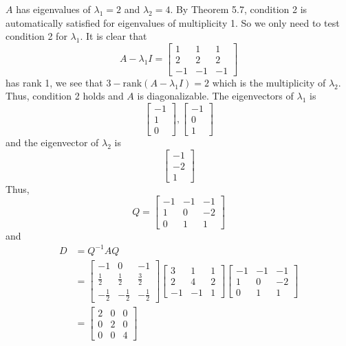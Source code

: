 \documentclass[11pt]{scrartcl}
\begin{document}
\begin{enumerate}[label=\alph*.]
{	      $A$ has eigenvalues of $\lambda_1 = 2 $ and $\lambda_2 = 4$.
	      By Theorem 5.7, condition 2 is automatically satisfied for eigenvalues of multiplicity 1.
	      So we only need to test condition 2 for $\lambda_1$.
	      It is clear that
	      \[
		      A - \lambda_1 I =
		      \begin{bmatrix}
			      1 & 1 & 1 \\ 2 & 2 & 2 \\ -1 & -1 & -1
		      \end{bmatrix}
	      \]
	      has rank 1, we see that $3 - \text{rank}(A - \lambda_1 I) = 2$ which is the multiplicity of $\lambda_2$.
	      Thus, condition 2 holds and $A$ is diagonalizable. The eigenvectors of $\lambda_1$ is
	      \[
		      \begin{bmatrix}
			      -1 \\ 1\\ 0
		      \end{bmatrix},
		      \begin{bmatrix}
			      -1 \\ 0\\ 1
		      \end{bmatrix}
	      \]
	      and the eigenvector of $\lambda_2$ is
	      \[
		      \begin{bmatrix}
			      -1 \\ -2\\ 1
		      \end{bmatrix}
	      \]
	      Thus,
	      \[
		      Q =
		      \begin{bmatrix}
			      -1 & -1 & -1 \\
			      1  & 0  & -2 \\
			      0  & 1  & 1
		      \end{bmatrix}
	      \]
	      and
	      \begin{align*}
		      D & = Q^{-1} A Q                \\
		        & =\begin{bmatrix}-1&0&-1\\ \frac{1}{2}&\frac{1}{2}&\frac{3}{2}\\ -\frac{1}{2}&-\frac{1}{2}&-\frac{1}{2}  \end{bmatrix}
		      \begin{bmatrix}
			      3 & 1 & 1 \\ 2 & 4 & 2 \\ -1 & -1 & 1
		      \end{bmatrix}
		      \begin{bmatrix}
			      -1 & -1 & -1 \\
			      1  & 0  & -2 \\
			      0  & 1  & 1
		      \end{bmatrix}      \\
		        & =
		      \begin{bmatrix}
			      2 & 0 & 0 \\ 0&2&0\\ 0&0&4
		      \end{bmatrix}
	      \end{align*}

	      }
\end{enumerate}
\end{document}
